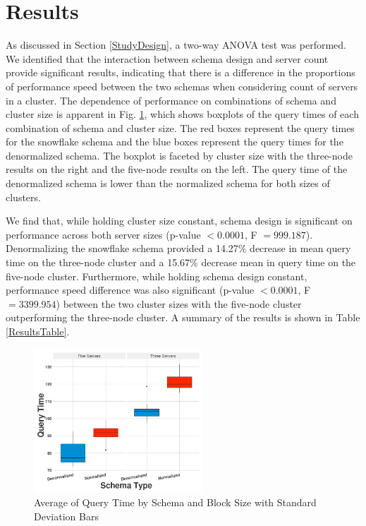 \documentclass[journal]{IEEEtran}
\begin{document}
\section{Results}

As discussed in Section \ref{StudyDesign}, a two-way ANOVA test was performed.
We identified that the interaction between schema design and server count provide significant results,
indicating that there is a difference in the proportions of performance speed between the two schemas when considering count of servers in a cluster.
The dependence of performance on combinations of schema and cluster size is apparent in Fig. \ref{Results},
 which shows boxplots of the query times of each combination of schema and cluster size.
The red boxes represent the query times for the snowflake schema and
 the blue boxes represent the query times for the denormalized schema.
The boxplot is faceted by cluster size with the three-node results on the right and
 the five-node results on the left.
The query time of the denormalized schema is lower than the normalized schema for both sizes of clusters.

We find that, while holding cluster size constant,
 schema design is significant on performance across both server sizes
 (p-value $< 0.0001$, F $ = 999.187$). 
Denormalizing the snowflake schema provided a 14.27\% decrease in mean query time on
 the three-node cluster and a 15.67\% decrease mean in query time on the five-node cluster.
Furthermore, while holding schema design constant, 
 performance speed difference was also significant 
 (p-value $< 0.0001$, F $= 3399.954$) 
 between the two cluster sizes with the five-node cluster outperforming
 the three-node cluster. 
A summary of the results is shown in Table \ref{ResultsTable}.

\begin{figure}
	\centering
	\includegraphics[width=2.5in]{Rplot.png}
	\caption{Average of Query Time by Schema and Block Size with Standard Deviation Bars}
	\label{Results}
\end{figure}
\end{document}
